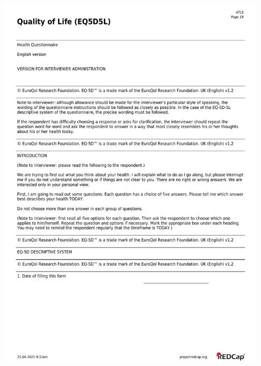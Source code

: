 \documentclass[
]{scrartcl}
\begin{document}
\includegraphics{../case-record-form/instrument-pdfs/pages/all-instruments-19.pdf}
\end{document}
